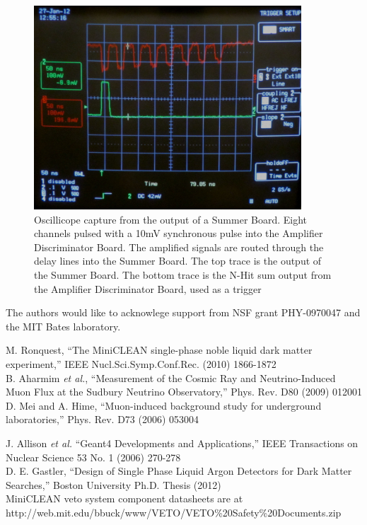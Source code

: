 \documentclass{JINST}
\begin{document}
\begin{figure}[ht]
\begin{center}
\includegraphics[height=3in, keepaspectratio=true]{graphics/delaypulse.jpg}
\caption{Oscillicope capture from the output of a Summer Board.  Eight channels pulsed with a 10mV synchronous pulse into the Amplifier Discriminator Board.  The amplified signals are routed through the delay lines into the Summer Board.  The top trace is the output of the Summer Board.  The bottom trace is the N-Hit sum output from the Amplifier Discriminator Board, used as a trigger
\label{fig:multipulse}}
\end{center}
\end{figure}

\acknowledgments
The authors would like to acknowlege support from NSF grant PHY-0970047 and the MIT Bates laboratory.


\begin{thebibliography}{999}

M. Ronquest, ``The MiniCLEAN single-phase noble liquid dark matter experiment,'' IEEE Nucl.Sci.Symp.Conf.Rec. (2010) 1866-1872 \\

B. Aharmim {\it et al.}, ``Measurement of the Cosmic Ray and Neutrino-Induced Muon Flux at the Sudbury Neutrino Observatory,'' Phys. Rev. D80 (2009) 012001 \\

D. Mei and A. Hime, ``Muon-induced background study for underground laboratories,'' Phys. Rev. D73 (2006) 053004

J. Allison {\it et al.} ``Geant4 Developments and Applications,'' IEEE Transactions on Nuclear Science 53 No. 1 (2006) 270-278 \\

D. E. Gastler, ``Design of Single Phase Liquid Argon Detectors for Dark Matter Searches,'' Boston University Ph.D. Thesis (2012) \\

 MiniCLEAN veto system component datasheets are at http://web.mit.edu/bbuck/www/VETO/VETO\%20Safety\%20Documents.zip \\

\end{thebibliography}
\end{document}

